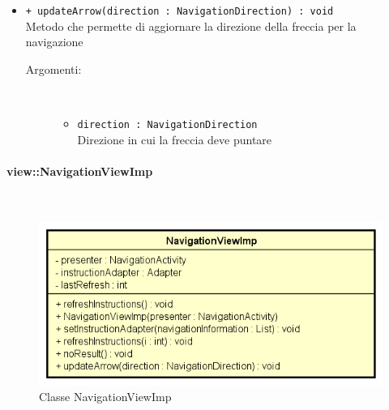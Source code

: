 \documentclass[../DefinizioneDiProdotto.tex]{subfiles}
\begin{document}
\begin{description}
\begin{itemize}
		\item \texttt{+ updateArrow(direction : NavigationDirection) : void}\\
		Metodo che permette di aggiornare la direzione della freccia per la navigazione
		\begin{description}
			\item[Argomenti:] \
			\begin{itemize}
				\item \texttt{direction : NavigationDirection}\\
				Direzione in cui la freccia deve puntare\end{itemize}
		\end{description}
	\end{itemize}
\end{description}

\paragraph{view::NavigationViewImp}
\
\begin{figure}[H]
	\centering
	\includegraphics[width=\maxwidth]{img/NavigationViewImp.png}
	\caption{Classe NavigationViewImp}\label{fig:view::NavigationViewImp} 
\end{figure}
\end{document}
